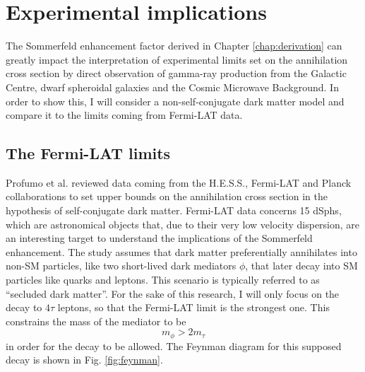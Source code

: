 \chapter{Experimental implications}\label{chap:implications}

The Sommerfeld enhancement factor derived in Chapter \ref{chap:derivation} can greatly impact the interpretation of experimental limits set on the annihilation cross section by direct observation of gamma-ray production from the Galactic Centre, dwarf spheroidal galaxies and the Cosmic Microwave Background. In order to show this, I will consider a non-self-conjugate dark matter model and compare it to the limits coming from Fermi-LAT data.

\section{The Fermi-LAT limits}

Profumo et al. \cite{Profumo_2018} reviewed data coming from the H.E.S.S., Fermi-LAT and Planck collaborations to set upper bounds on the annihilation cross section in the hypothesis of self-conjugate dark matter. Fermi-LAT data concerns 15 dSphs, which are astronomical objects that, due to their very low velocity dispersion, are an interesting target to understand the implications of the Sommerfeld enhancement. The study assumes that dark matter preferentially annihilates into non-SM particles, like two short-lived dark mediators \(\phi \), that later decay into SM particles like quarks and leptons. This scenario is typically referred to as ``secluded dark matter''. For the sake of this research, I will only focus on the decay to \(4\tau \) leptons, so that the Fermi-LAT limit is the strongest one. This constrains the mass of the mediator to be
\begin{equation}\label{eq:mediator_mass}
	m_{\phi }  > 2 m_{\tau } 
\end{equation}
in order for the decay to be allowed. The Feynman diagram for this supposed decay is shown in Fig. \ref{fig:feynman}.

